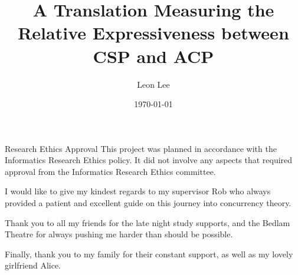 \documentclass[logo,bsc,singlespacing,parskip,online]{infthesis}
\begin{document}
\begin{preliminary}

\title{A Translation Measuring the Relative Expressiveness between CSP and ACP}

\author{Leon Lee}
\date{\today}


\maketitle

\newenvironment{ethics}
   {\begin{frontenv}{Research Ethics Approval}{\LARGE}}
   {\end{frontenv}\newpage}

\begin{ethics}
This project was planned in accordance with the Informatics Research
Ethics policy. It did not involve any aspects that required approval
from the Informatics Research Ethics committee.

\standarddeclaration
\end{ethics}


\begin{acknowledgements}
   I would like to give my kindest regards to my supervisor Rob who always provided a patient and excellent guide on this journey into concurrency theory.

   Thank you to all my friends for the late night study supports, and the Bedlam Theatre for always pushing me harder than should be possible.

   Finally, thank you to my family for their constant support, as well as my lovely girlfriend Alice.
\end{acknowledgements}

\end{preliminary}
\end{document}
